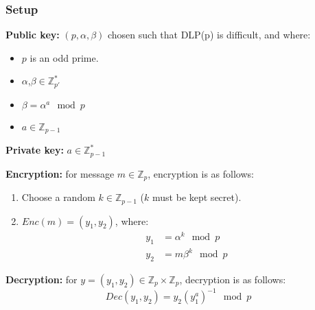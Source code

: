
\subsubsection*{Setup}
\textbf{Public key:} $(p,\alpha,\beta)$ chosen such that DLP(p) is
difficult, and where:
\begin{itemize}
\item $p$ is an odd prime.
\item $\alpha$,$\beta \in \mathbb{Z}_{p'}^*$
\item $\beta = \alpha^a \mod p$
\item $a \in \mathbb{Z}_{p-1} $
\end{itemize}

\textbf{Private key:} $a \in \mathbb{Z}_{p-1}^*$

\textbf{Encryption:} for message $m \in \mathbb{Z}_p$, encryption is
as follows:
\begin{enumerate}
\item Choose a random $k \in \mathbb{Z}_{p-1}$ ($k$ must be kept secret).
\item $Enc(m) = (y_1,y_2)$, where:
  \begin{align*}
    y_1 &= \alpha^k \mod p\\
    y_2 &= m\beta^k \mod p
  \end{align*}
\end{enumerate}

\textbf{Decryption:} for $y = (y_1,y_2) \in \mathbb{Z}_p \times
\mathbb{Z}_p$, decryption is as follows:
\[ Dec(y_1,y_2) = y_2(y_1^a)^{-1} \mod p \]

